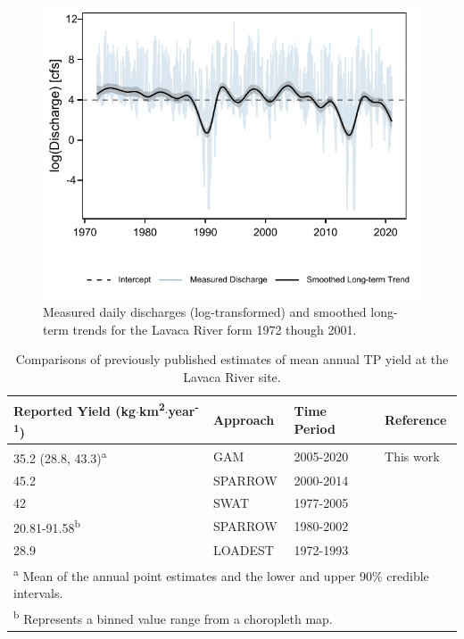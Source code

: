 \documentclass[fleqn,10pt,lineno]{wlpeerj} %
\begin{document}
\begin{figure}

{\centering \includegraphics[width=0.7\linewidth,]{Schramm-2023-08-PeerJ_files/figure-latex/fig8} 

}

\caption{Measured daily discharges (log-transformed) and smoothed long-term trends for the Lavaca River form 1972 though 2001.}\label{fig:fig8}
\end{figure}

\begin{table}

\caption{\label{tab:table5}Comparisons of previously published estimates of mean annual TP yield at the Lavaca River site.}
\centering
\begin{tabular}[t]{llll}
\toprule
Reported Yield (kg$\cdot$km\textsuperscript{2}$\cdot$year\textsuperscript{-1}) & Approach & Time Period & Reference\\
\midrule
35.2 (28.8, 43.3)\textsuperscript{a} & GAM & 2005-2020 & This work\\
45.2 & SPARROW & 2000-2014 & \cite{wise_spatially_2019}\\
42 & SWAT & 1977-2005 & \cite{omaniEstimationSedimentNutrient2014}\\
20.81-91.58\textsuperscript{b} & SPARROW & 1980-2002 & \cite{rebichSourcesDeliveryNutrients2011}\\
28.9 & LOADEST & 1972-1993 & \cite{dunnTrendsNutrientInflows1996}\\
\bottomrule
\multicolumn{4}{l}{\rule{0pt}{1em}\textsuperscript{a} Mean of the annual point estimates and the lower and upper 90\% credible intervals.}\\
\multicolumn{4}{l}{\rule{0pt}{1em}\textsuperscript{b} Represents a binned value range from a choropleth map.}\\
\end{tabular}
\end{table}
\end{document}
